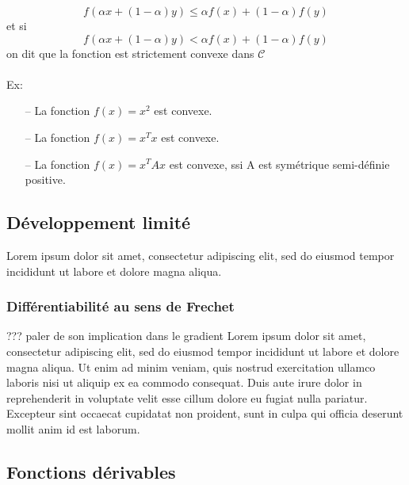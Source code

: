 				
		\begin{equation}
			f(\alpha x + (1 - \alpha)y) \leq \alpha f(x) + (1 - \alpha)f(y)
			\label{eq_convexe-1}
		\end{equation}
		et si
		\begin{equation}
			f(\alpha x + (1 - \alpha)y) < \alpha f(x) + (1 - \alpha)f(y)
			\label{eq_convexe-2}
		\end{equation}
		on dit que la fonction est strictement convexe dans $\mathcal{C}$\\\\
		Ex: 
		\begin{itemize}
			\item[--] La fonction $ f(x) = x^2$ est convexe. 
			\item[--] La fonction $ f(x) = x^T x$ est convexe.
			\item[--] La fonction $ f(x) = x^T Ax$ est convexe, ssi A est symétrique semi-définie positive.
		\end{itemize}
		 
		
	\subsection{Développement limité}\label{dev_lim}
			Lorem ipsum dolor sit amet, consectetur adipiscing elit, sed do eiusmod tempor incididunt ut labore et dolore magna aliqua.
			\subsubsection{Différentiabilité au sens de Frechet}
			??? paler de son implication dans le gradient 
			Lorem ipsum dolor sit amet, consectetur adipiscing elit, sed do eiusmod tempor incididunt ut labore et dolore magna aliqua. Ut enim ad minim veniam, quis nostrud exercitation ullamco laboris nisi ut aliquip ex ea commodo consequat. Duis aute irure dolor in reprehenderit in voluptate velit esse cillum dolore eu fugiat nulla pariatur. Excepteur sint occaecat cupidatat non proident, sunt in culpa qui officia deserunt mollit anim id est laborum.
		
	\subsection{Fonctions dérivables}
	
